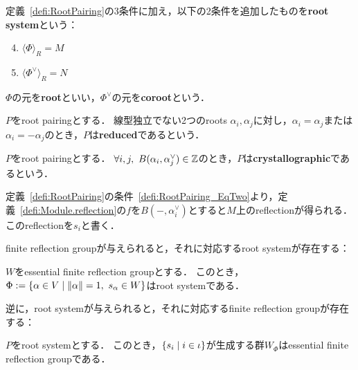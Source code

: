 \begin{definition}
  \label{defi:RootSystem}
  \leanok
  定義~\ref{defi:RootPairing}の3条件に加え，以下の2条件を追加したものを\textbf{root system}という：
  \begin{enumerate}[label=(\roman*)]
    \setcounter{enumi}{3}
    \item $\langle \Phi \rangle_R = M$
    \item $\langle \Phi^\vee \rangle_R = N$
  \end{enumerate}
  $\Phi$の元を\textbf{root}といい，$\Phi^\vee$の元を\textbf{coroot}という．
\end{definition}

\begin{definition}
  \label{defi:RootPairing.IsReduced}
  \leanok
  $P$をroot pairingとする．
  線型独立でない2つのroots $\alpha_i, \alpha_j$に対し，$\alpha_i = \alpha_j$または$\alpha_i = -\alpha_j$のとき，$P$は\textbf{reduced}であるという．
\end{definition}

\begin{definition}
  \label{defi:RootPairing.IsCrystallographic}
  \leanok
  $P$をroot pairingとする．
  $\forall i, j,\ B(\alpha_i, \alpha^\vee_j) \in \mathbb{Z}$のとき，$P$は\textbf{crystallographic}であるという．
\end{definition}

\begin{definition}
  \label{defi:RootPairing.reflection}
  \leanok
  定義~\ref{defi:RootPairing}の条件~\ref{defi:RootPairing_EqTwo}より，定義~\ref{defi:Module.reflection}の$f$を$B(-, \alpha^\vee_i)$とすると$M$上のreflectionが得られる．
  このreflectionを$s_i$と書く．
\end{definition}

finite reflection groupが与えられると，それに対応するroot systemが存在する：

\begin{proposition}
  \label{prop:FiniteReflectionGroup.essFRG_to_RootSystem}
  \notready
  $W$をessential finite reflection groupとする．
  このとき，$\Phi := \set{\alpha \in V}{\norm{\alpha} = 1,\ s_\alpha \in W}$はroot systemである．
\end{proposition}

逆に，root systemが与えられると，それに対応するfinite reflection groupが存在する：
\begin{proposition}
  \label{prop:FiniteReflectionGroup.RootSystem_to_essFRG}
  $P$をroot systemとする．
  このとき，$\left\lbrace s_i \mathrel{} \middle| \mathrel{} i \in \iota \right\rbrace$が生成する群$W_\Phi$はessential finite reflection groupである．
\end{proposition}

